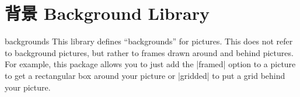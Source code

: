 %
%
%


\section{背景 Background Library}
\label{section-tikz-backgrounds}

\begin{tikzlibrary}{backgrounds}
    This library defines ``backgrounds'' for pictures. This does not refer to
    background pictures, but rather to frames drawn around and behind pictures.
    For example, this package allows you to just add the |framed| option to a
    picture to get a rectangular box around your picture or |gridded| to put a
    grid behind your picture.
\end{tikzlibrary}

